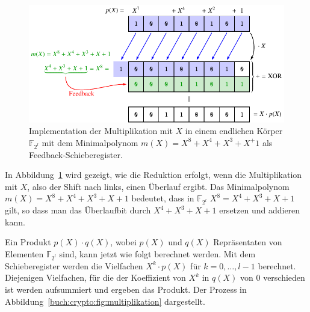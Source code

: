 \begin{figure}
\centering
\includegraphics{chapters/90-crypto/images/schieberegister.pdf}
\caption{Implementation der Multiplikation mit $X$ in einem 
endlichen Körper $\mathbb{F}_{2^l}$ mit dem Minimalpolynom
$m(X) = X^8+X^4+X^3+X^+1$ als Feedback-Schieberegister.
\label{buch:crypto:fig:schieberegister}}
\end{figure}

In Abbildung~\ref{buch:crypto:fig:schieberegister} wird gezeigt,
wie die Reduktion erfolgt, wenn die Multiplikation mit $X$, also der
Shift nach links, einen Überlauf ergibt.
Das Minimalpolynom $m(X)=X^8+X^4+X^3+X+1$ bedeutet, dass in $\mathbb{F}_{2^l}$
$X^8=X^4+X^3+X+1$ gilt, so dass man das Überlaufbit durch 
$X^4+X^3+X+1$ ersetzen und addieren kann.

Ein Produkt $p(X)\cdot q(X)$, wobei $p(X)$ und
$q(X)$ Repräsentaten von Elementen $\mathbb{F}_{2^l}$ sind, kann jetzt
wie folgt berechnet werden.
Mit dem Schieberegister werden die Vielfachen $X^k\cdot p(X)$ 
für $k=0,\dots,l-1$ berechnet.
Diejenigen Vielfachen, für die der Koeffizient von $X^k$ in $q(X)$
von $0$ verschieden ist werden aufsummiert und ergeben das Produkt.
Der Prozess in Abbildung~\ref{buch:crypto:fig:multiplikation}
dargestellt.


